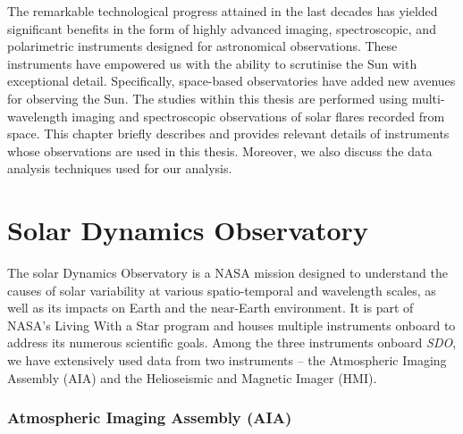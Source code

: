 


\justifying

The remarkable technological progress attained in the last decades has yielded significant benefits in the form of highly advanced imaging, spectroscopic, and polarimetric instruments designed for astronomical observations. These instruments have empowered us with the ability to scrutinise the Sun with exceptional detail. Specifically, space-based observatories have added new avenues for observing the Sun. The studies within this thesis are performed using multi-wavelength imaging and spectroscopic observations of solar flares recorded from space. This chapter briefly describes and provides relevant details of instruments whose observations are used in this thesis. Moreover, we also discuss the data analysis techniques used for our analysis.

\section{Solar Dynamics Observatory}

The solar Dynamics Observatory \citep[SDO;][]{sdo} is a NASA mission designed to understand the causes of solar variability at various spatio-temporal and wavelength scales, as well as its impacts on Earth and the near-Earth environment. It is part of NASA’s Living With a Star program and houses multiple instruments onboard to address its numerous scientific goals. Among the three instruments onboard {\it SDO}, we have extensively used data from two instruments – the Atmospheric Imaging Assembly (AIA) and the Helioseismic and Magnetic Imager (HMI).

\subsubsection{Atmospheric Imaging Assembly (AIA)}

